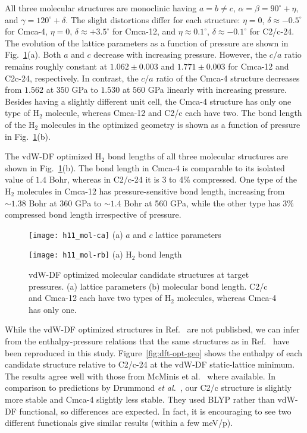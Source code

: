 All three molecular structures are monoclinic having $a=b\neq c$, $\alpha=\beta=90^\circ+\eta$, and $\gamma=120^\circ+\delta$. The slight distortions differ for each structure: $\eta=0$, $\delta\approx -0.5^\circ$ for Cmca-4, $\eta=0$, $\delta\approx+3.5^\circ$ for Cmca-12, and $\eta\approx0.1^\circ$, $\delta\approx-0.1^\circ$ for C2/c-24.
The evolution of the lattice parameters as a function of pressure are shown in Fig.~\ref{fig:hsolid-vdw-ca}(a).
Both $a$ and $c$ decrease with increasing pressure.
However, the $c/a$ ratio remains roughly constant at $1.062\pm0.003$ and $1.771\pm0.003$ for Cmca-12 and C2c-24, respectively.
In contrast, the $c/a$ ratio of the Cmca-4 structure decreases from $1.562$ at $350$ GPa to $1.530$ at $560$ GPa linearly with increasing pressure.
Besides having a slightly different unit cell, the Cmca-4 structure has only one type of H$_2$ molecule, whereas Cmca-12 and C2/c each have two.
The bond length of the H$_2$ molecules in the optimized geometry is shown as a function of pressure in Fig.~\ref{fig:hsolid-vdw-ca}(b).

The vdW-DF optimized H$_2$ bond lengths of all three molecular structures are shown in Fig.~\ref{fig:hsolid-vdw-ca}(b).
The bond length in Cmca-4 is comparable to its isolated value of $1.4$ Bohr, whereas in C2/c-24 it is 3 to 4\% compressed.
One type of the H$_2$ molecules in Cmca-12 has pressure-sensitive bond length, increasing from $\sim 1.38$ Bohr at 360 GPa to $\sim 1.4$ Bohr at 560 GPa, while the other type has 3\% compressed bond length irrespective of pressure.

\begin{figure}[h]
\centering
\begin{minipage}{0.49\textwidth}
\centering
\texttt{[image: h11\_mol-ca]}
(a) $a$ and $c$ lattice parameters
\end{minipage}
\begin{minipage}{0.49\textwidth}
\centering
\texttt{[image: h11\_mol-rb]}
(a) H$_2$ bond length
\end{minipage}
\caption{vdW-DF optimized molecular candidate structures at target pressures. (a) lattice parameters (b) molecular bond length. C2/c and Cmca-12 each have two types of H$_2$ molecules, whereas Cmca-4 has only one.}
\label{fig:hsolid-vdw-ca}
\end{figure}

While the vdW-DF optimized structures in Ref.~\cite{McMinis2015} are not published, we can infer from the enthalpy-pressure relations that the same structures as in Ref.~\cite{McMinis2015} have been reproduced in this study. Figure~\ref{fig:dft-opt-geo} shows the enthalpy of each candidate structure relative to C2/c-24 at the vdW-DF static-lattice minimum. The results agree well with those from McMinis et al.~\cite{McMinis2015} where available.
In comparison to predictions by Drummond \textit{et al.}~\cite{Drummond2015}, our C2/c structure is slightly more stable and Cmca-4 slightly less stable.
They used BLYP rather than vdW-DF functional, so differences are expected. In fact, it is encouraging to see two different functionals give similar results (within a few meV/p).

